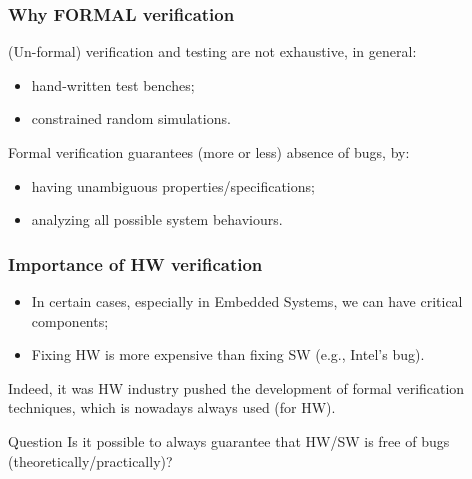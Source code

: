 \documentclass[usenames,dvipsnames]{beamer}
\begin{document}

\begin{frame}
  \frametitle{Why FORMAL verification}

(Un-formal) verification and testing are not exhaustive, in general:
\begin{itemize}
\item hand-written test benches;
\item constrained random simulations.	
\end{itemize}


\vfill \pause

\begin{ntblock}

\centering

Formal verification guarantees (more or less) absence of bugs, by:
\begin{itemize}
  \item having unambiguous properties/specifications;
  \item analyzing all possible system behaviours.
\end{itemize}


\end{ntblock}

\end{frame}




\begin{frame}
  \frametitle{Importance of HW verification}
  
\begin{itemize}
\item In certain cases, especially in Embedded Systems, we can have critical components;
  \item Fixing HW is more expensive than fixing SW (e.g., Intel's bug).
\end{itemize}

\vfill

Indeed, it was HW industry pushed the development of formal verification techniques, which is nowadays always used (for HW).

\vfill \pause

\vfill
\begin{alertblock}{Question} 
Is it possible to always guarantee that HW/SW is free of bugs (theoretically/practically)?
  \end{alertblock}
\end{frame}
\end{document}
